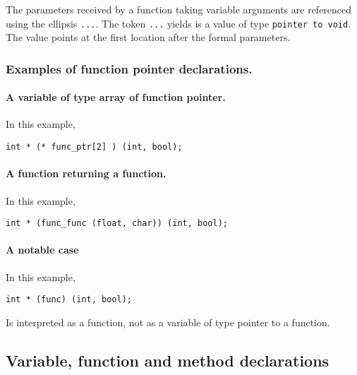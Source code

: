 The parameters received by a function taking variable arguments are
referenced using the ellipsis \passthrough{\lstinline!...!}. The token
\passthrough{\lstinline!...!} yields is a value of type
\passthrough{\lstinline!pointer to void!}. The value points at the first
location after the formal parameters.

\hypertarget{examples-of-function-pointer-declarations.}{%
\subsubsection{Examples of function pointer
declarations.}\label{examples-of-function-pointer-declarations.}}

\hypertarget{a-variable-of-type-function-pointer.}{%
\paragraph{A variable of type array of function pointer.}
\label{a-variable-of-type-function-pointer.}}
In this example,
\begin{lstlisting}
int * (* func_ptr[2] ) (int, bool);
\end{lstlisting}

\hypertarget{a-function-returning-a-function.}{%
\paragraph{A function returning a
function.}\label{a-function-returning-a-function.}}
In this example,

\begin{lstlisting}
int * (func_func (float, char)) (int, bool);
\end{lstlisting}

\hypertarget{a-notable-case}{%
\paragraph{A notable case}\label{a-notable-case}}
In this example,

\begin{lstlisting}
int * (func) (int, bool);
\end{lstlisting}

Is interpreted as a function, not as a variable of type pointer to a
function.

\hypertarget{variable-function-and-method-declarations}{%
\subsection{Variable, function and method
declarations}\label{variable-function-and-method-declarations}}

